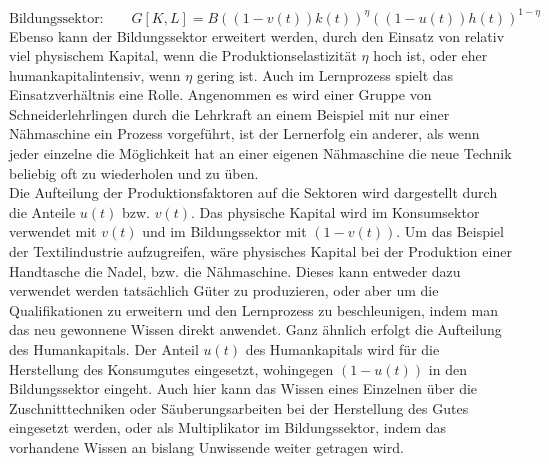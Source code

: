 %
\begin{equation}
	\text{Bildungssektor:} \qquad G[K,L]= B((1-v(t))k(t))^{\eta}((1-u(t))h(t))^{1-\eta}
	\label{eq:ProduktionsfunktionH}
\end{equation}
%
Ebenso kann der Bildungssektor erweitert werden, durch den Einsatz von relativ viel physischem Kapital, wenn die Produktionselastizität $\eta$ hoch ist, oder eher humankapitalintensiv, wenn $\eta$ gering ist. Auch im Lernprozess spielt das Einsatzverhältnis eine Rolle. Angenommen es wird einer Gruppe von Schneiderlehrlingen durch die Lehrkraft an einem Beispiel mit nur einer Nähmaschine ein Prozess vorgeführt, ist der Lernerfolg ein anderer, als wenn jeder einzelne die Möglichkeit hat an einer eigenen Nähmaschine die neue Technik beliebig oft zu wiederholen und zu üben. \\
%
Die Aufteilung der Produktionsfaktoren auf die Sektoren wird dargestellt durch die Anteile $u(t)$ bzw. $v(t)$. Das physische Kapital wird im Konsumsektor verwendet mit $v(t)$ und im Bildungssektor mit $(1-v(t))$. Um das Beispiel der Textilindustrie aufzugreifen, wäre physisches Kapital bei der Produktion einer Handtasche die Nadel, bzw. die Nähmaschine. Dieses kann entweder dazu verwendet werden tatsächlich Güter zu produzieren, oder aber um die Qualifikationen zu erweitern und den Lernprozess zu beschleunigen, indem man das neu gewonnene Wissen direkt anwendet. Ganz ähnlich erfolgt die Aufteilung des Humankapitals. Der Anteil $u(t)$ des Humankapitals wird für die Herstellung des Konsumgutes eingesetzt, wohingegen $(1-u(t))$  in den Bildungssektor eingeht. Auch hier kann das Wissen eines Einzelnen über die Zuschnitttechniken oder Säuberungsarbeiten  bei der Herstellung des Gutes eingesetzt werden, oder als Multiplikator im Bildungssektor, indem das vorhandene Wissen an bislang Unwissende weiter getragen wird.
%
